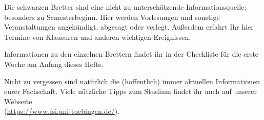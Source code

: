 
Die schwarzen Bretter sind eine nicht zu unterschätzende
  Informationsquelle; besonders zu Semesterbeginn.  Hier werden
  Vorlesungen und sonstige Veranstaltungen angekündigt, abgesagt oder
  verlegt.  Außerdem erfahrt Ihr hier Termine von Klausuren und anderen
  wichtigen Ereignissen.

Informationen zu den einzelnen Brettern findet ihr in der Checkliste
  für die erste Woche am Anfang dieses Hefts.

Nicht zu vergessen sind natürlich die (hoffentlich) immer aktuellen
  Informationen eurer Fachschaft. Viele nützliche Tipps zum Studium
  findet ihr auch auf unserer Webseite\\
  (\url{https://www.fsi.uni-tuebingen.de/}).

